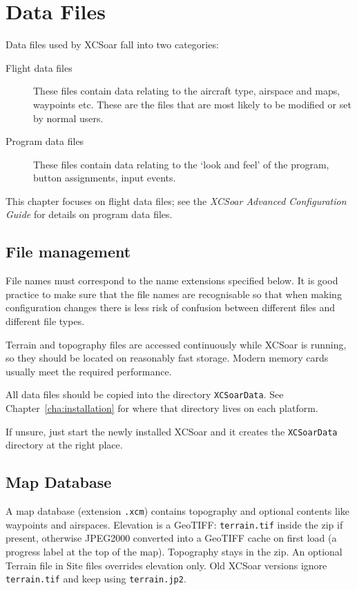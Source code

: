 \chapter{Data Files}\label{cha:data-files}

Data files used by XCSoar fall into two categories:
\begin{description}
\item[Flight data files]  These files contain data relating to
the aircraft type, airspace and maps, waypoints etc.  These are the
files that are most likely to be modified or set by normal users.
\item[Program data files]  These files contain data relating to
the `look and feel' of the program,
button assignments, input events.
\end{description}
This chapter focuses on flight data files; see the {\em XCSoar
Advanced Configuration Guide} for details on program data files.

\section{File management}

File names must correspond to the name extensions specified below.  It
is good practice to make sure that the file names are recognisable so
that when making configuration changes there is less risk of confusion
between different files and different file types.

Terrain and topography files are accessed continuously while XCSoar is
running, so they should be located on reasonably fast storage.
Modern memory cards usually meet the required performance.

All data files should be copied into the directory
\verb|XCSoarData|.  See Chapter~\ref{cha:installation} for where that
directory lives on each platform.

If unsure, just start the newly installed XCSoar and it creates the \verb|XCSoarData|
directory at the right place.

\section{Map Database}\label{sec:map}

A map database (extension \verb|.xcm|) contains topography and
optional contents like waypoints and airspaces.  Elevation is a
GeoTIFF: \verb|terrain.tif| inside the zip if present, otherwise
JPEG2000 converted into a GeoTIFF cache on first load (a progress
label at the top of the map).  Topography stays in the zip.  An optional Terrain
file in Site files overrides elevation only.  Old XCSoar versions
ignore \verb|terrain.tif| and keep using \verb|terrain.jp2|.

